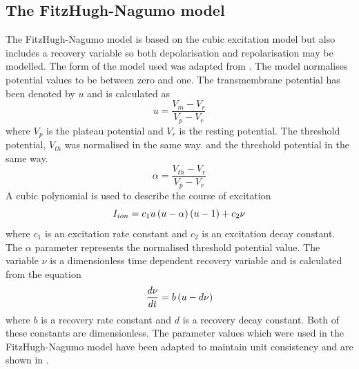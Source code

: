 \subsection{The FitzHugh-Nagumo model}
\label{The_FitzHugh-Nagumo_Model}
The FitzHugh-Nagumo model is based on the cubic excitation model but also includes a recovery
variable so both depolarisation and repolarisation may be modelled. The form
of the model used was adapted from \citet{rogers:1994a}. The model
normalises potential values to be between zero and one. The transmembrane
potential has been denoted by $u$ and is calculated as
\begin{equation}
  u = \dfrac{V_m - V_r}{V_p - V_r}
\end{equation}
where $V_p$ is the plateau potential and $V_r$ is the resting potential. The
threshold potential, $V_{th}$ was normalised in the same way.
and the threshold potential in the same way.
\begin{equation}
  \alpha = \dfrac{V_{th} - V_r}{V_p - V_r}
\end{equation}
A cubic polynomial is used to describe the course of excitation
\begin{equation}
  I_{ion} = c_1 u \left( u - \alpha \right) \left( u - 1 \right) + c_2 \nu
  \label{eqn:FHN_excitation_equation}
\end{equation}
where $c_1$ is an excitation rate constant and $c_2$ is an excitation decay
constant. The $\alpha$ parameter represents the normalised threshold potential
value. The variable $\nu$ is a dimensionless time dependent recovery variable and is
calculated from the equation 
\begin{equation}
   \dfrac{ d \nu}{d t}  = b \left( u - d \nu \right)
\end{equation}
where $b$ is a recovery rate constant and $d$ is a recovery decay
constant. Both of these constants are dimensionless. The parameter values which
were used in the FitzHugh-Nagumo model 
have been adapted to maintain unit consistency and are shown in
. 
